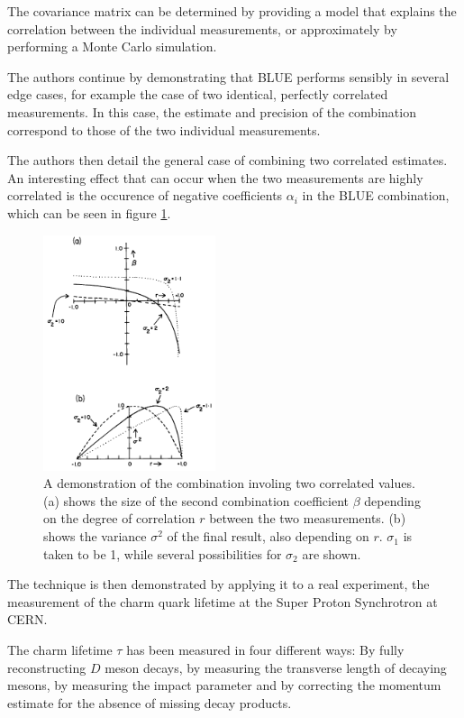 The covariance matrix can be determined by providing a model that explains the correlation between the individual measurements, or approximately by performing a Monte Carlo simulation.

The authors continue by demonstrating that BLUE performs sensibly in several edge cases, for example the case of two identical, perfectly correlated measurements.
In this case, the estimate and precision of the combination correspond to those of the two individual measurements.

The authors then detail the general case of combining two correlated estimates.
An interesting effect that can occur when the two measurements are highly correlated is the occurence of negative coefficients $α_i$ in the BLUE combination, which can be seen in figure \ref{simple}.

\begin{figure}
  \centering
  \includegraphics[width=0.45\textwidth]{./figures/simple.pdf}
  \caption{A demonstration of the combination involing two correlated values. (a) shows the size of the second combination coefficient $β$ depending on the degree of correlation $r$ between the two measurements. (b) shows the variance $σ^2$ of the final result, also depending on $r$. $σ_1$ is taken to be 1, while several possibilities for $σ_2$ are shown. \cite{lyons}}
  \label{simple}
\end{figure}

The technique is then demonstrated by applying it to a real experiment, the measurement of the charm quark lifetime at the Super Proton Synchrotron at CERN.

The charm lifetime $τ$ has been measured in four different ways\cite{augilar}: By fully reconstructing $D$ meson decays, by measuring the transverse length of decaying mesons, by measuring the impact parameter and by correcting the momentum estimate for the absence of missing decay products.

